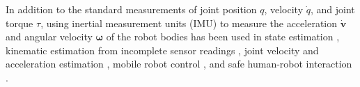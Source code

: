 
In addition to the standard measurements of joint position $q$, velocity $\dot{q}$, and joint torque $\tau$, using inertial measurement units (IMU) to measure the acceleration $\dot{\bm{v}}$
and angular velocity $\bm{\omega}$ of the robot bodies has been used in state estimation \cite{DeLuca2007accelerationbasedstate}, kinematic estimation from incomplete sensor readings \cite{Rollinson2013RobustStateEstimation}, joint velocity and acceleration estimation \cite{Birjandi2019Jointvelocityacceleration, Rotella2016Inertialsensorbased}, mobile robot control \cite{Dutta2019StabilityAnalysisHumanoid}, and safe human-robot interaction \cite{Hamad2023ModularizeConquerGeneralized}.

%

